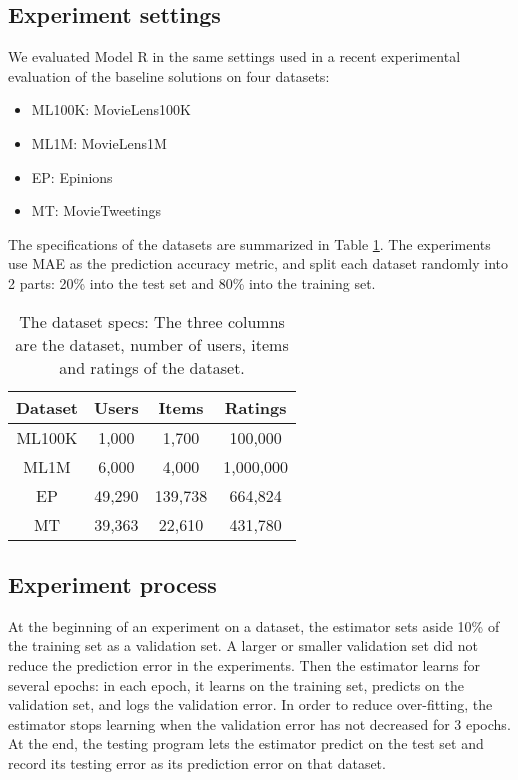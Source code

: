 \documentclass[sigconf]{acmart}
\begin{document}
\subsection{Experiment settings}
We evaluated Model R in the same settings used in a recent experimental 
evaluation of the baseline solutions \cite{polatidis2016multi} on four datasets:
\begin{itemize}
	\item ML100K: MovieLens100K\cite{harper2015movielens}
	\item ML1M: MovieLens1M\cite{harper2015movielens}
	\item EP: Epinions \cite{massa2007trust}
	\item MT: MovieTweetings \cite{dooms2013movietweetings}
\end{itemize}
The specifications of the datasets are summarized in Table \ref{tab:dataset}.
The experiments use MAE as the prediction accuracy metric,
and split each dataset randomly into 2 parts: 20\% into the test set and 80\% 
into the training set.
\begin{table}[!htb]
	\centering
	\caption{The dataset specs: 
		The three columns are the dataset, number of users, items and ratings 
		of the dataset.
		}
	\begin{tabular}{cccc}  \hline
		Dataset & Users   & Items   & Ratings \\ \hline
		ML100K  & 1,000   & 1,700   & 100,000 \\ \hline
		ML1M    & 6,000   & 4,000   & 1,000,000 \\ \hline
		EP      & 49,290  & 139,738 & 664,824 \\ \hline
		MT      & 39,363  & 22,610  & 431,780 \\ \hline
	\end{tabular}
	\label{tab:dataset}
\end{table}

\subsection{Experiment process}
At the beginning of an experiment on a dataset,
the estimator sets aside 10\% of the training set as a validation set.
A larger or smaller validation set did not reduce the prediction error in the 
experiments.
Then the estimator learns for several epochs:
in each epoch,
it learns on the training set,
predicts on the validation set,
and logs the validation error.
In order to reduce over-fitting,
the estimator stops learning when the validation error has not decreased for 3 
epochs.
At the end, the testing program lets the estimator predict on the test set 
and record its testing error as its prediction error on that dataset.
\end{document}
